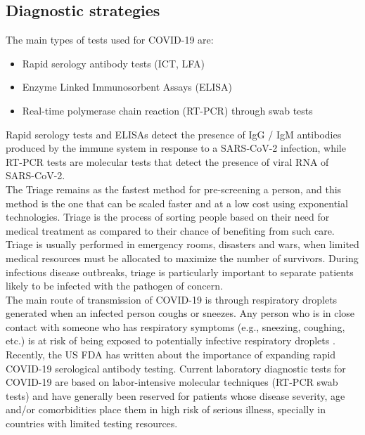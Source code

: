 \documentclass{nle}
\begin{document}
\subsection{Diagnostic strategies}

The main types of tests used for COVID-19 are:
\begin{itemize}
    \item Rapid serology antibody tests (ICT, LFA)
    \item Enzyme Linked Immunosorbent Assays (ELISA)
    \item Real-time polymerase chain reaction (RT-PCR) through swab tests
\end{itemize}

Rapid serology tests and ELISAs detect the presence of IgG / IgM antibodies produced by the immune system in response to a SARS-CoV-2 infection, while RT-PCR tests are molecular tests that detect the presence of viral RNA of SARS-CoV-2.\\

The Triage remains as the fastest method for pre-screening a person, and this method is the one that can be scaled faster and at a low cost using exponential technologies. Triage is the process of sorting people based on their need for medical treatment as compared to their chance of benefiting from such care. Triage is usually performed in emergency rooms, disasters and wars, when limited medical resources must be allocated to maximize the number of survivors. During infectious disease outbreaks, triage is particularly important to separate patients likely to be infected with the pathogen of concern.\\

The main route of transmission of COVID-19 is through respiratory droplets generated when an infected person coughs or sneezes.  Any person who is in close contact with someone who has respiratory symptoms (e.g., sneezing, coughing, etc.) is at risk of being exposed to potentially infective respiratory droplets \cite{37}.\\

Recently, the US FDA \cite{18} has written about the importance of expanding rapid COVID-19 serological antibody testing. Current laboratory diagnostic tests for COVID-19 are based on labor-intensive molecular techniques (RT-PCR swab tests) and have generally been reserved for patients whose disease severity, age and/or comorbidities place them in high risk of serious illness, specially in countries with limited testing resources.\\
\end{document}
